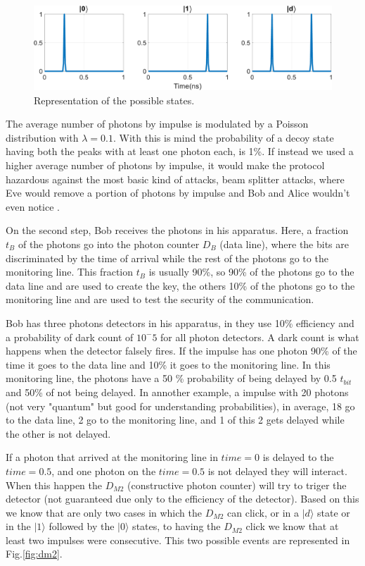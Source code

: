\begin{refsection}
\begin{figure}[hbt!]
\centering
\includegraphics[width=1\linewidth]{./sdf/tq_76558_cow_protocol/slides/figures/S1.pdf}
\caption{Representation of the possible states.}
\label{fig:sta}
\end{figure}

The average number of photons by impulse is modulated by a Poisson distribution with $\lambda=0.1$. With this is mind the probability of a decoy state having both the peaks with at least one photon each, is 1\%. If instead we used a higher average number of photons by impulse, it would make the protocol hazardous against the most basic kind of attacks, beam splitter attacks, where Eve would remove a portion of photons by impulse and Bob and Alice wouldn't even notice \cite{kronberg2017analysis}.

On the second step, Bob receives the photons in his apparatus. Here, a fraction $t_B$ of the photons go into the photon counter $D_B$ (data line), where the bits are discriminated by the time of arrival while the rest of the photons go to the monitoring line. This fraction $t_B$ is usually 90\%, so 90\% of the photons go to the data line and are used to create the key, the others 10\% of the photons go to the monitoring line and are used to test the security of the communication.

Bob has three photons detectors in his apparatus, in \cite{gisin2004towards} they use 10\% efficiency and a probability of dark count of $10^-5$ for all photon detectors. A dark count is what happens when the detector falsely fires. If the impulse has one photon 90\% of the time it goes to the data line and 10\% it goes to the monitoring line. In this monitoring line, the photons have a 50 \% probability of being delayed by 0.5 $t_{bit}$ and 50\% of not being delayed.  In annother example, a impulse with 20 photons (not very "quantum" but good for understanding probabilities), in average, 18 go to the data line, 2 go to the monitoring line, and 1 of this 2 gets delayed while the other is not delayed.

If a photon that arrived at the monitoring line in $time=0$ is delayed to the $time=0.5$, and one photon on the $time=0.5$ is not delayed they will interact. When this happen the $D_{M2}$ (constructive photon counter) will try to triger the detector (not guaranteed due only to the efficiency of the detector). Based on this we know that are only two cases in which the $D_{M2}$ can click, or in a $|d\rangle$ state or in the $|1\rangle$ followed by the $|0\rangle$ states, to having the $D_{M2}$ click we know that at least two impulses were consecutive. This two possible events are represented in Fig.\ref{fig:dm2}.


\end{refsection}
